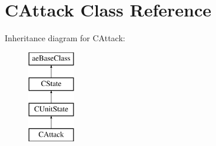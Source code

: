 \hypertarget{class_c_attack}{}\section{C\+Attack Class Reference}
\label{class_c_attack}
Inheritance diagram for C\+Attack\+:\begin{figure}[H]
\begin{center}
\leavevmode
\includegraphics[height=4.000000cm]{class_c_attack}
\end{center}
\end{figure}
